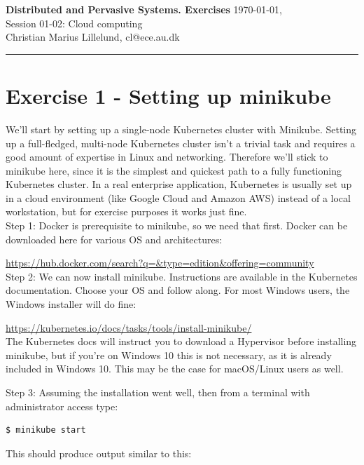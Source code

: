 \documentclass[a4paper,10pt]{article}
\begin{document}
	
\textbf{Distributed and Pervasive Systems. Exercises} \hfill \today, \currenttime\\
Session 01-02: Cloud computing\\
Christian Marius Lillelund, cl@ece.au.dk\\
\hrule

\section{Exercise 1 - Setting up minikube}
		
We'll start by setting up a single-node Kubernetes cluster with Minikube. Setting up a full-fledged, multi-node Kubernetes cluster isn't a trivial task and requires a good amount of expertise in Linux and networking. Therefore we'll stick to minikube here, since it is the simplest and quickest path to a fully functioning Kubernetes cluster. In a real enterprise application, Kubernetes is usually set up in a cloud environment (like Google Cloud and Amazon AWS) instead of a local workstation, but for exercise purposes it works just fine. \\

Step 1: Docker is prerequisite to minikube, so we need that first. Docker can be downloaded here for various OS and architectures:

\url{https://hub.docker.com/search?q=&type=edition&offering=community} \\

Step 2: We can now install minikube. Instructions are available in the Kubernetes documentation. Choose your OS and follow along. For most Windows users, the Windows installer will do fine:

\url{https://kubernetes.io/docs/tasks/tools/install-minikube/} \\

The Kubernetes docs will instruct you to download a Hypervisor before installing minikube, but if you're on Windows 10 this is not necessary, as it is already included in Windows 10. This may be the case for macOS/Linux users as well.

Step 3: Assuming the installation went well, then from a terminal with administrator access type:

\begin{lstlisting}[numbers=none, basicstyle=\mdseries]
$ minikube start
\end{lstlisting}

This should produce output similar to this:
\end{document}
